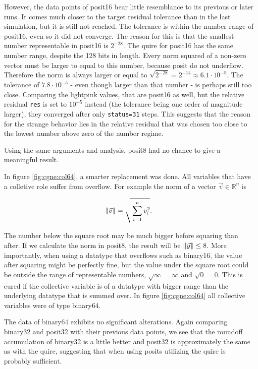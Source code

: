 \documentclass{article}
\theoremstyle{plain} %
\theoremstyle{remark} %
\def\code#1{\texttt{#1}}
\numberwithin{equation}{section}
\begin{document}
However, the data points of \gls{posit16} bear little resemblance to its previous or later runs. It comes much closer to the target residual tolerance than in the last simulation, but it is still not reached. The tolerance is within the number range of \gls{posit16}, even so it did not converge. The reason for this is that the smallest number representable in \gls{posit16} is $2^{-28}$. The \gls{quire} for \gls{posit16} has the same number range, despite the \num{128} bits in length. Every norm squared of a non-zero vector must be larger to equal to this number, because posit do not underflow. Therefore the norm is always larger or equal to $\sqrt{2^{-28}} = 2^{-14} \approx 6.1 \cdot 10^{-5}$. The tolerance of $7.8 \cdot 10^{-5}$ - even though larger than that number - is perhaps still too close. Comparing the \textcolor{clightpink}{lightpink} values, that are \gls{posit16} as well, but the relative residual \code{res} is set to $10^{-5}$ instead (the tolerance being one order of magnitude larger), they converged after only \code{status=31} steps. This suggests that the reason for the strange behavior lies in the relative residual that was chosen too close to the lowest number above zero of the number regime.

Using the same arguments and analysis, \gls{posit8} had no chance to give a meaningful result.

In figure \ref{fig:cgne:col64}, a smarter replacement was done. All variables that have a colletive role suffer from overflow. For example the norm of a vector $\vec{v} \in \mathbb{R}^n$ is 

\begin{align*}
    \norm{\vec{v}} = \sqrt{ \sum_{i=1}^{n} v_i^2 }.
\end{align*}

The number below the square root may be much bigger before squaring than after. If we calculate the norm in \gls{posit8}, the result will be $\norm{\vec{y}} \leq 8$. More importantly, when using a datatype that overflows such as \gls{binary16}, the value after squaring might be perfectly fine, but the value under the square root could be outside the range of representable numbers, $\sqrt{\infty} = \infty$ and $\sqrt{0} = 0$. This is cured if the collective variable is of a datatype with bigger range than the underlying datatype that is summed over. In figure \ref{fig:cgne:col64} all collective variables were of type \gls{binary64}.

The data of \gls{binary64} exhibits no significant alterations. Again comparing \gls{binary32} and \gls{posit32} with their previous data points, we see that the roundoff accumulation of \gls{binary32} is a little better and \gls{posit32} is approximately the same as with the \gls{quire}, suggesting that when using posits utilizing the \gls{quire} is probably sufficient.
\end{document}
